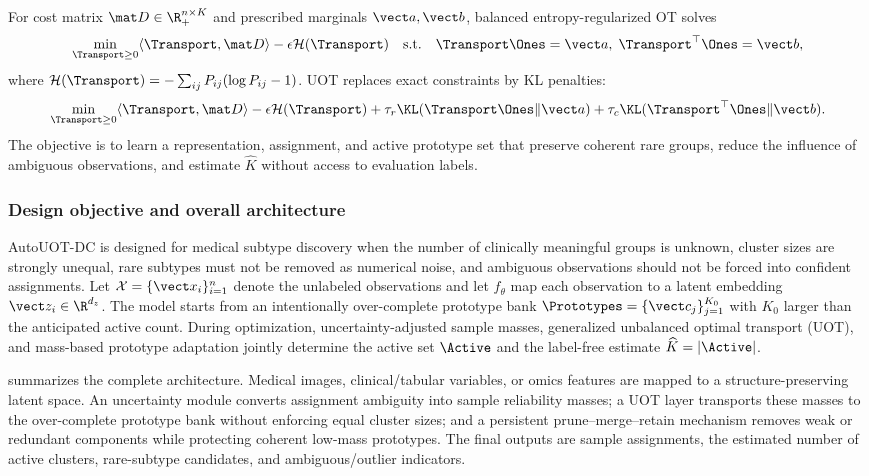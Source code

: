 For cost matrix $\mat D\in\R_+^{n\times K}$ and prescribed marginals $\vect a,\vect b$, balanced entropy-regularized OT solves
\begin{equation}
\min_{\Transport\ge0}\langle\Transport,\mat D\rangle-\epsilon\mathcal H(\Transport)
\quad\text{s.t.}\quad
\Transport\Ones=\vect a,\;\Transport^\top\Ones=\vect b,
\label{eq:balanced_ot}
\end{equation}
where $\mathcal H(\Transport)=-\sum_{ij}P_{ij}(\log P_{ij}-1)$. UOT replaces exact constraints by KL penalties:
\begin{equation}
\min_{\Transport\ge0}\langle\Transport,\mat D\rangle-\epsilon\mathcal H(\Transport)
+\tau_r\KL(\Transport\Ones\|\vect a)
+\tau_c\KL(\Transport^\top\Ones\|\vect b).
\label{eq:generic_uot}
\end{equation}
The objective is to learn a representation, assignment, and active prototype set that preserve coherent rare groups, reduce the influence of ambiguous observations, and estimate $\widehat K$ without access to evaluation labels.



\subsubsection{Design objective and overall architecture}
AutoUOT-DC is designed for medical subtype discovery when the number of clinically meaningful groups is unknown, cluster sizes are strongly unequal, rare subtypes must not be removed as numerical noise, and ambiguous observations should not be forced into confident assignments. Let $\mathcal X=\{\vect x_i\}_{i=1}^{n}$ denote the unlabeled observations and let $f_{\theta}$ map each observation to a latent embedding $\vect z_i\in\R^{d_z}$. The model starts from an intentionally over-complete prototype bank $\Prototypes=\{\vect c_j\}_{j=1}^{K_0}$ with $K_0$ larger than the anticipated active count. During optimization, uncertainty-adjusted sample masses, generalized unbalanced optimal transport (UOT), and mass-based prototype adaptation jointly determine the active set $\Active$ and the label-free estimate $\widehat K=|\Active|$.

 summarizes the complete architecture. Medical images, clinical/tabular variables, or omics features are mapped to a structure-preserving latent space. An uncertainty module converts assignment ambiguity into sample reliability masses; a UOT layer transports these masses to the over-complete prototype bank without enforcing equal cluster sizes; and a persistent prune--merge--retain mechanism removes weak or redundant components while protecting coherent low-mass prototypes. The final outputs are sample assignments, the estimated number of active clusters, rare-subtype candidates, and ambiguous/outlier indicators.

